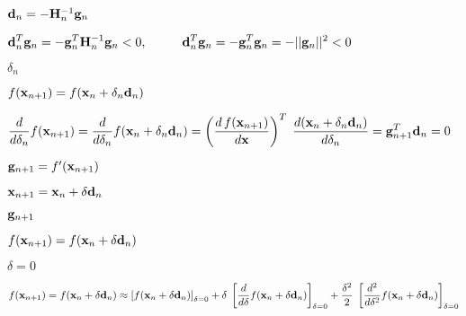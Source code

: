 \documentclass{article}
\def\lthtmlcheckvsize{\ifdim\ht\sizebox<\vsize 
  \ifdim\wd\sizebox<\hsize\expandafter\hfill\fi \expandafter\vfill
  \else\expandafter\vss\fi}%
\begin{document}
{\newpage\clearpage
{}%
$ {\bf d}_n=-{\bf H}_n^{-1}{\bf g}_n$%
\lthtmlindisplaymathZ
\lthtmlcheckvsize\clearpage}

{\newpage\clearpage
{}%
$\displaystyle {\bf d}_n^T{\bf g}_n=-{\bf g}_n^T{\bf H}_n^{-1}{\bf g}_n <0,\;\;\;\;\;\;\;\;\;\;
{\bf d}_n^T{\bf g}_n=-{\bf g}_n^T{\bf g}_n=-||{\bf g}_n||^2 <0$%
\lthtmlindisplaymathZ
\lthtmlcheckvsize\clearpage}

{\newpage\clearpage
{}%
$ \delta_n$%
\lthtmlindisplaymathZ
\lthtmlcheckvsize\clearpage}

{\newpage\clearpage
{}%
$ f({\bf x}_{n+1})=f({\bf x}_n+\delta_n{\bf d}_n)$%
\lthtmlindisplaymathZ
\lthtmlcheckvsize\clearpage}

{\newpage\clearpage
{}%
$\displaystyle \frac{d}{d\delta_n} f({\bf x}_{n+1})
=\frac{d}{d\delta_n}f({\bf x}_n+\delta_n{\bf d}_n)
=\left(\frac{d\,f({\bf x}_{n+1})}{d{\bf x}}\right)^T\;
\frac{d({\bf x}_n+\delta_n{\bf d}_n)}{d\delta_n}
={\bf g}^T_{n+1}{\bf d}_n=0$%
\lthtmlindisplaymathZ
\lthtmlcheckvsize\clearpage}

{\newpage\clearpage
{}%
$ {\bf g}_{n+1}=f'({\bf x}_{n+1})$%
\lthtmlindisplaymathZ
\lthtmlcheckvsize\clearpage}

{\newpage\clearpage
{}%
$ {\bf x}_{n+1}={\bf x}_n+\delta{\bf d}_n$%
\lthtmlindisplaymathZ
\lthtmlcheckvsize\clearpage}

{\newpage\clearpage
{}%
$ {\bf g}_{n+1}$%
\lthtmlindisplaymathZ
\lthtmlcheckvsize\clearpage}

{\newpage\clearpage
{}%
$ f({\bf x}_{n+1})=f({\bf x}_n+\delta{\bf d}_n)$%
\lthtmlindisplaymathZ
\lthtmlcheckvsize\clearpage}

{\newpage\clearpage
{}%
$ \delta=0$%
\lthtmlindisplaymathZ
\lthtmlcheckvsize\clearpage}

{\newpage\clearpage
{}%
$\displaystyle f({\bf x}_{n+1})=f({\bf x}_n+\delta{\bf d}_n)\approx
\left[f({\bf x}_n+\delta{\bf d}_n)\right]_{\delta=0}
+\delta\;\left[\frac{d}{d\delta}f({\bf x}_n+\delta{\bf d}_n)\right]_{\delta=0}
+\frac{\delta^2}{2}\;\left[\frac{d^2}{d\delta^2}f({\bf x}_n+\delta{\bf d}_n)\right]_{\delta=0}$%
\lthtmlindisplaymathZ
\lthtmlcheckvsize\clearpage}
\end{document}
